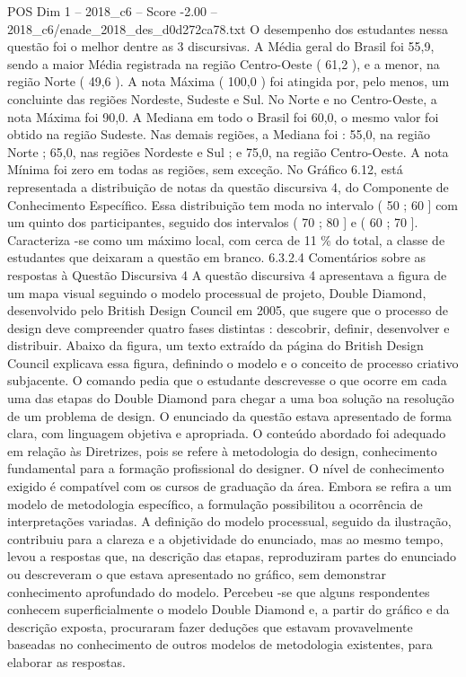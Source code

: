 \begin{textsample}{POS Dim 1 – 2018\_c6 – Score -2.00 – 2018\_c6/enade\_2018\_des\_d0d272ca78.txt}
O desempenho dos estudantes nessa questão foi o melhor dentre as 3 discursivas.
A Média geral do Brasil foi 55,9, sendo a maior Média registrada na região Centro-Oeste ( 61,2 ), e a menor, na região Norte ( 49,6 ).
A nota Máxima ( 100,0 ) foi atingida por, pelo menos, um concluinte das regiões Nordeste, Sudeste e Sul.
No Norte e no Centro-Oeste, a nota Máxima foi 90,0.
A Mediana em todo o Brasil foi 60,0, o mesmo valor foi obtido na região Sudeste.
Nas demais regiões, a Mediana foi : 55,0, na região Norte ; 65,0, nas regiões Nordeste e Sul ; e 75,0, na região Centro-Oeste.
A nota Mínima foi zero em todas as regiões, sem exceção.
No Gráfico 6.12, está representada a distribuição de notas da questão discursiva 4, do Componente de Conhecimento Específico.
Essa distribuição tem moda no intervalo ( 50 ; 60 ] com um quinto dos participantes, seguido dos intervalos ( 70 ; 80 ] e ( 60 ; 70 ].
Caracteriza -se como um máximo local, com cerca de 11 \% do total, a classe de estudantes que deixaram a questão em branco. 6.3.2.4 Comentários sobre as respostas à Questão Discursiva 4 A questão discursiva 4 apresentava a figura de um mapa visual seguindo o modelo processual de projeto, Double Diamond, desenvolvido pelo British Design Council em 2005, que sugere que o processo de design deve compreender quatro fases distintas : descobrir, definir, desenvolver e distribuir.
Abaixo da figura, um texto extraído da página do British Design Council explicava essa figura, definindo o modelo e o conceito de processo criativo subjacente.
O comando pedia que o estudante descrevesse o que ocorre em cada uma das etapas do Double Diamond para chegar a uma boa solução na resolução de um problema de design.
O enunciado da questão estava apresentado de forma clara, com linguagem objetiva e apropriada.
O conteúdo abordado foi adequado em relação às Diretrizes, pois se refere à metodologia do design, conhecimento fundamental para a formação profissional do designer.
O nível de conhecimento exigido é compatível com os cursos de graduação da área.
Embora se refira a um modelo de metodologia específico, a formulação possibilitou a ocorrência de interpretações variadas.
A definição do modelo processual, seguido da ilustração, contribuiu para a clareza e a objetividade do enunciado, mas ao mesmo tempo, levou a respostas que, na descrição das etapas, reproduziram partes do enunciado ou descreveram o que estava apresentado no gráfico, sem demonstrar conhecimento aprofundado do modelo.
Percebeu -se que alguns respondentes conhecem superficialmente o modelo Double Diamond e, a partir do gráfico e da descrição exposta, procuraram fazer deduções que estavam provavelmente baseadas no conhecimento de outros modelos de metodologia existentes, para elaborar as respostas.

\end{textsample}
